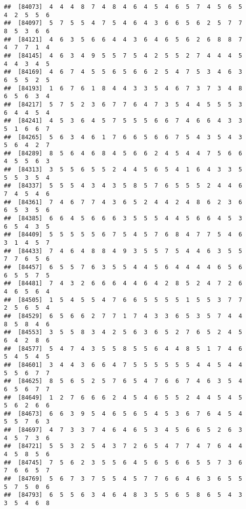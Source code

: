 \documentclass[
]{book}
\begin{document}
\begin{verbatim}
##  [84073]  4  4  4  8  7  4  8  4  6  4  5  4  6  5  7  4  5  6  5  4  2  5  5  6
##  [84097]  5  7  5  5  4  7  5  4  6  4  3  6  6  5  6  2  5  7  7  8  5  3  6  6
##  [84121]  4  6  3  5  6  6  4  4  3  6  4  6  5  6  2  6  8  8  7  4  7  7  1  4
##  [84145]  4  6  3  4  9  5  5  7  5  4  2  5  5  2  7  4  4  4  5  4  4  3  4  5
##  [84169]  4  6  7  4  5  5  6  5  6  6  2  5  4  7  5  3  4  6  3  6  5  5  2  5
##  [84193]  1  6  7  6  1  8  4  4  3  3  5  4  6  7  3  7  3  4  8  6  5  6  3  4
##  [84217]  5  7  5  2  3  6  7  7  6  4  7  3  5  4  4  5  5  5  3  6  4  4  5  4
##  [84241]  4  5  3  6  4  5  7  5  5  5  6  6  7  4  6  6  4  3  3  5  1  6  6  7
##  [84265]  5  6  3  4  6  1  7  6  6  5  6  6  7  5  4  3  5  4  3  5  6  4  2  7
##  [84289]  8  5  6  4  6  8  4  5  6  6  2  4  5  4  4  7  5  6  6  4  5  5  6  3
##  [84313]  3  5  5  6  5  5  2  4  4  5  6  5  4  1  6  4  3  3  5  5  5  3  5  4
##  [84337]  5  5  5  4  3  4  3  5  8  5  7  6  5  5  5  2  4  4  6  7  4  5  4  6
##  [84361]  7  4  6  7  7  4  3  6  5  2  4  4  2  4  8  6  2  3  6  6  5  3  5  6
##  [84385]  6  6  4  5  6  6  6  3  5  5  5  4  4  5  6  6  4  5  3  6  5  4  3  5
##  [84409]  5  5  5  5  5  6  7  5  4  5  7  6  8  4  7  7  5  4  6  3  1  4  5  7
##  [84433]  7  4  6  4  8  8  4  9  3  5  5  7  5  4  4  6  3  5  5  7  7  6  5  6
##  [84457]  6  5  5  7  6  3  5  5  4  4  5  6  4  4  4  4  6  5  6  6  5  5  7  5
##  [84481]  7  4  3  2  6  6  6  4  4  6  4  2  8  5  2  4  7  2  6  4  6  5  6  4
##  [84505]  1  5  4  5  5  4  7  6  6  5  5  5  5  1  5  5  3  7  7  2  5  6  5  4
##  [84529]  6  5  6  6  2  7  7  1  7  4  3  3  6  5  3  5  7  4  4  8  5  8  4  6
##  [84553]  3  5  5  8  3  4  2  5  6  3  6  5  2  7  6  5  2  4  5  6  4  2  8  6
##  [84577]  5  4  7  4  3  5  5  8  5  5  6  4  4  8  5  1  7  4  6  5  4  5  4  5
##  [84601]  3  4  4  3  6  6  4  7  5  5  5  5  5  5  4  4  5  4  4  5  5  6  7  7
##  [84625]  8  5  6  5  2  5  7  6  5  4  7  6  6  7  4  6  3  5  4  6  5  6  7  7
##  [84649]  1  2  7  6  6  6  2  4  5  4  6  5  5  2  4  4  5  4  5  5  6  2  6  6
##  [84673]  6  6  3  9  5  4  6  5  6  5  4  5  3  6  7  6  4  5  4  5  5  7  6  3
##  [84697]  4  7  3  3  7  4  6  4  6  5  3  4  5  6  6  5  2  6  3  4  5  7  3  6
##  [84721]  5  5  3  2  5  4  3  7  2  6  5  4  7  7  4  7  6  4  4  4  5  8  5  6
##  [84745]  7  5  6  2  3  5  5  6  4  5  6  5  6  6  5  5  7  3  6  7  6  6  5  7
##  [84769]  5  6  7  3  7  5  5  4  5  7  7  6  6  4  6  3  6  5  5  5  7  5  0  6
##  [84793]  6  5  5  6  3  4  6  4  8  3  5  5  6  5  8  6  5  4  3  3  5  4  6  8

\end{verbatim}
\end{document}

